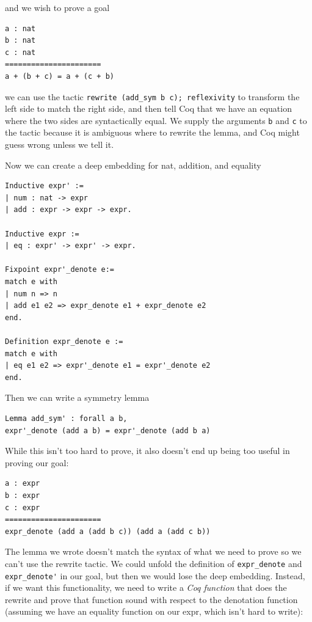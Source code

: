 \documentclass{puthesis}
\begin{document}
and we wish to prove a goal 

\begin{lstlisting}
a : nat
b : nat
c : nat
======================
a + (b + c) = a + (c + b) 
\end{lstlisting}

we can use the tactic \lstinline|rewrite (add_sym b c); reflexivity|
to transform the left side to match the right side, and then tell Coq
that we have an equation where the two sides are syntactically
equal. We supply the arguments \lstinline|b| and \lstinline|c| to the
tactic because it is ambiguous where to rewrite the lemma, and Coq
might guess wrong unless we tell it.

Now we can create a deep embedding for nat, addition, and equality

\begin{lstlisting}
Inductive expr' :=
| num : nat -> expr
| add : expr -> expr -> expr.

Inductive expr :=
| eq : expr' -> expr' -> expr.

Fixpoint expr'_denote e:=
match e with
| num n => n
| add e1 e2 => expr_denote e1 + expr_denote e2
end.

Definition expr_denote e :=
match e with
| eq e1 e2 => expr'_denote e1 = expr'_denote e2
end.
\end{lstlisting} 

Then we can write a symmetry lemma

\begin{lstlisting}
Lemma add_sym' : forall a b, 
expr'_denote (add a b) = expr'_denote (add b a)
\end{lstlisting}

While this isn't too hard to prove, it also doesn't end up being too
useful in proving our goal:

\begin{lstlisting}
a : expr
b : expr
c : expr
======================
expr_denote (add a (add b c)) (add a (add c b))  
\end{lstlisting}

The lemma we wrote doesn't match the syntax of what we need to prove
so we can't use the rewrite tactic. We could unfold the definition of
\lstinline|expr_denote| and \lstinline|expr_denote'| in our goal, but
then we would lose the deep embedding. Instead, if we want this
functionality, we need to write a \emph{Coq function} that does the
rewrite and prove that function sound with respect to the denotation
function (assuming we have an equality function on our expr, which
isn't hard to write):
\end{document}
